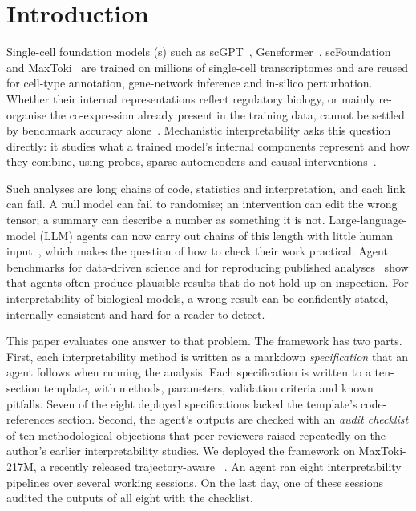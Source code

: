 \section*{Introduction}

Single-cell foundation models (\scfm{}s) such as
scGPT~\cite{cui2024scgpt}, Geneformer~\cite{theodoris2023geneformer},
scFoundation~\cite{hao2024scfoundation} and
MaxToki~\cite{maxtoki2026} are trained on millions of single-cell
transcriptomes and are reused for cell-type annotation, gene-network
inference and in-silico perturbation. Whether their internal
representations reflect regulatory biology, or mainly re-organise the
co-expression already present in the training data, cannot be settled by
benchmark accuracy
alone~\cite{kedzierska2023assessing,liu2023evaluating,wenteler2024perteval}.
Mechanistic interpretability asks this question directly: it studies what
a trained model's internal components represent and how they combine,
using probes, sparse autoencoders and causal
interventions~\cite{bricken2023monosemanticity,conmy2023acdc,wang2023ioi,sharkey2025open}.

Such analyses are long chains of code, statistics and interpretation, and
each link can fail. A null model can fail to randomise; an intervention
can edit the wrong tensor; a summary can describe a number as something
it is not. Large-language-model (LLM) agents can now carry out chains of
this length with little human
input~\cite{lu2024aiscientist,boiko2023autonomous,mbran2024chemcrow,yang2024sweagent,chan2024mlebench},
which makes the question of how to check their work practical. Agent
benchmarks for data-driven science and for reproducing published
analyses~\cite{chen2024scienceagentbench,siegel2024corebench,starace2025paperbench}
show that agents often produce plausible results that do not hold up on
inspection. For interpretability of biological models, a wrong result can
be confidently stated, internally consistent and hard for a reader to
detect.

This paper evaluates one answer to that problem. The framework has two
parts. First, each interpretability method is written as a markdown
\emph{specification} that an agent follows when running the analysis.
Each specification is written to a ten-section template, with methods,
parameters, validation criteria and known pitfalls. Seven of the eight
deployed specifications lacked the template's code-references section.
Second, the agent's outputs are checked with an \emph{audit checklist}
of ten methodological objections that peer reviewers raised repeatedly
on the author's earlier interpretability studies. We
deployed the framework on MaxToki-217M, a recently released
trajectory-aware \scfm{}~\cite{maxtoki2026}. An agent ran eight
interpretability pipelines over several working sessions. On the last
day, one of these sessions audited the outputs of all eight with the
checklist.

